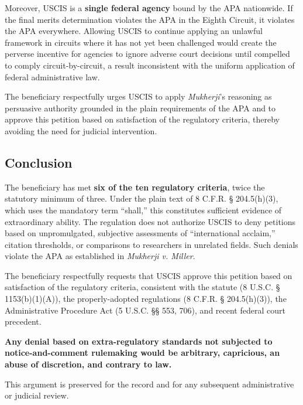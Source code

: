 Moreover, USCIS is a \textbf{single federal agency} bound by the APA nationwide. If the final merits determination violates the APA in the Eighth Circuit, it violates the APA everywhere. Allowing USCIS to continue applying an unlawful framework in circuits where it has not yet been challenged would create the perverse incentive for agencies to ignore adverse court decisions until compelled to comply circuit-by-circuit, a result inconsistent with the uniform application of federal administrative law.

The beneficiary respectfully urges USCIS to apply \textit{Mukherji}'s reasoning as persuasive authority grounded in the plain requirements of the APA and to approve this petition based on satisfaction of the regulatory criteria, thereby avoiding the need for judicial intervention.

\subsection{Conclusion}

The beneficiary has met \textbf{six of the ten regulatory criteria}, twice the statutory minimum of three. Under the plain text of 8 C.F.R. § 204.5(h)(3), which uses the mandatory term ``shall,'' this constitutes sufficient evidence of extraordinary ability. The regulation does not authorize USCIS to deny petitions based on unpromulgated, subjective assessments of ``international acclaim,'' citation thresholds, or comparisons to researchers in unrelated fields. Such denials violate the APA as established in \textit{Mukherji v. Miller}.

The beneficiary respectfully requests that USCIS approve this petition based on satisfaction of the regulatory criteria, consistent with the statute (8 U.S.C. § 1153(b)(1)(A)), the properly-adopted regulations (8 C.F.R. § 204.5(h)(3)), the Administrative Procedure Act (5 U.S.C. §§ 553, 706), and recent federal court precedent.

\textbf{Any denial based on extra-regulatory standards not subjected to notice-and-comment rulemaking would be arbitrary, capricious, an abuse of discretion, and contrary to law.}

This argument is preserved for the record and for any subsequent administrative or judicial review.
